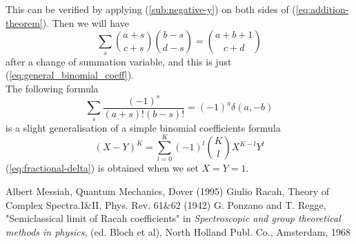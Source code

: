 \documentclass{article}
\begin{document}
This can be verified by applying (\ref{sub:negative-y}) on both sides of (\ref{eq:addition-theorem}). Then we will have
\begin{equation}
\label{eq:}
\sum_{s} \binom{a+s}{c+s}\binom{b-s}{d-s} = \binom{a+b+1}{c+d}
\end{equation}
after a change of summation variable, and this is just (\ref{eq:general_binomial_coeff}).\\
The following formula 
\begin{equation}
\label{eq:fractional-delta}
\sum_{s} \frac{(-1)^{s}}{(a+s)!(b-s)!} = (-1)^{a} \delta(a, -b)
\end{equation}
is a slight generalisation of a simple binomial coefficients formula
\begin{equation}
\label{eq:}
(X-Y)^{K} = \sum_{l=0}^{K} (-1)^{l} \binom{K}{l} X^{K-l}Y^{l}
\end{equation}
(\ref{eq:fractional-delta}) is obtained when we set $X=Y=1$.
\begin{thebibliography}{10}
  Albert Messiah, Quantum Mechanics, Dover (1995)
  Giulio Racah, Theory of Complex Spectra.I\&II, Phys. Rev. 61\&62 (1942)
  G. Ponzano and T. Regge, "Semiclassical limit of Racah coefficients" in \textit{Spectroscopic and group theoretical methods in physics}, (ed. Bloch et al), North Holland Publ. Co., Amsterdam, 1968
\end{thebibliography}
\end{document}
